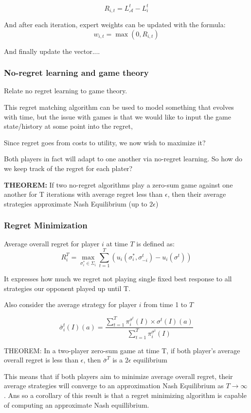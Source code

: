 \documentclass{article}
\begin{document}
\[ R_{i,t} = L^t_{\mathcal{A}} - L^t_i \]

And after each iteration, expert weights can be updated with the formula: 
\[ w_{i,t} = \max(0, R_{i,t}) \]

And finally update the vector....

\subsubsection{No-regret learning and game theory}
Relate no regret learning to game theory. 
 
This regret matching algorithm can be used to model something that evolves with time, but the issue with games is that we would like to input the game state/history at some point into the regret,

Since regret goes from costs to utility, we now wish to maximize it?

Both players in fact will adapt to one another via no-regret learning. So how do we keep track of the regret for each plater?

\textbf{THEOREM:}
If two no-regret algorithms play a zero-sum game against one another for T iterations with average regret less than $\epsilon$, then their average strategies approximate Nash Equilibrium (up to $2 \epsilon$) 

\subsubsection{Regret Minimization}
Average overall regret for player $i$ at time $T$ is defined as:
\[ R^T_i = \max_{\sigma^*_i \in \Sigma_i} \sum_{t=1}^T (u_i(\sigma^*_i, \sigma_{-i}^t) - u_i(\sigma^t)) \]

It expresses how much we regret not playing single fixed best response to all strategies our opponent played up until T. 

Also consider the average strategy for player $i$ from time 1 to $T$

\[ \bar\sigma^t_i (I)(a) = \frac
{\sum_{t=1}^T \pi_i^{\sigma^t}(I) \times  \sigma^t (I)(a)} 
{\sum_{t=1}^T \pi_i^{\sigma^t}(I)} \]

THEOREM: In a two-player zero-sum game at time T, if both player's average overall regret is less than $\epsilon$, then $\bar\sigma^T$ is a $2 \epsilon$ equilibrium

This means that if both players aim to minimize average overall regret, their average strategies will converge to an approximation Nash Equilibrium as $T \to \infty$. Ans so a corollary of this result is that a regret minimizing algorithm is capable of computing an approximate Nash equillibrium. 
\end{document}
